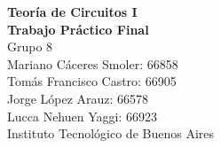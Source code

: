\begin{titlepage}
\vspace*{0.18\textheight}
\begin{center}
    {\Large \textbf{Teoría de Circuitos I}}\\[0.5em]
    {\Large \textbf{Trabajo Práctico Final}}\\[1em]

    {\large Grupo 8}\\[1.5em]
    Mariano Cáceres Smoler: 66858\\
    Tomás Francisco Castro: 66905\\
    Jorge López Arauz: 66578\\
    Lucca Nehuen Yaggi: 66923\\[1.5em]
    Instituto Tecnológico de Buenos Aires
\end{center}
\end{titlepage}
